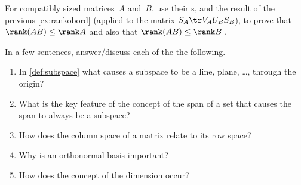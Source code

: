 \begin{exercise} \label{ex:} 
For compatibly sized matrices~\(A\) and~\(B\), use their \svd{}s, and the result of the previous \autoref{ex:rankobord} (applied to the matrix \(S_A\tr V_AU_BS_B\)), to prove that \(\rank(AB)\leq\rank A\) and also that \(\rank(AB)\leq\rank B\)\,.
\end{exercise}




\begin{exercise} \label{ex:} 
In a few sentences, answer\slash discuss each of the the following.
\begin{enumerate}
\item In \autoref{def:subspace} what causes a subspace to be a line, plane, \ldots, through the origin?

\item What is the key feature of the concept of the span of a set that causes the span to always be a subspace?

\item How does the column space of a matrix relate to its row space?

\item Why is an orthonormal basis important?

\item How does the concept of the dimension occur?

\end{enumerate}
\end{exercise}

\begin{comment}%
why, what caused X?
how did X occur?
what-if? what-if-not?
how does X compare with Y?
what is the evidence for X?
why is X important?
\end{comment}







